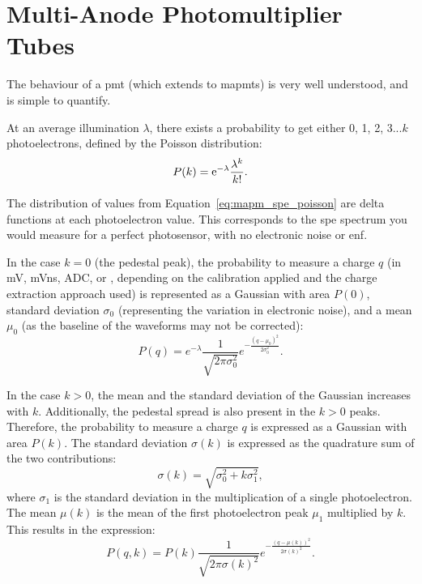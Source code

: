 \section{Multi-Anode Photomultiplier Tubes}

The behaviour of a \gls{pmt} (which extends to \glspl{mapmt}) is very well understood, and is simple to quantify. 

At an average illumination $\lambda$, there exists a probability to get either 0, 1, 2, 3...$k$ photoelectrons, defined by the Poisson distribution:
\begin{equation} \label{eq:mapm_spe_poisson}
P(k) = \mathrm{e}^{-\lambda} \frac{\lambda^k}{k!}.
\end{equation}

The distribution of values from Equation~\ref{eq:mapm_spe_poisson} are delta functions at each photoelectron value. This corresponds to the \gls{spe} spectrum you would measure for a perfect photosensor, with no electronic noise or \gls{enf}. 

In the case $k = 0$ (the pedestal peak), the probability to measure a charge $q$ (in \si{mV}, \si{mVns}, \si{ADC}, or \si{\pe}, depending on the calibration applied and the charge extraction approach used) is represented as a Gaussian with area $P(0)$, standard deviation $\sigma_0$ (representing the variation in electronic noise), and a mean $\mu_0$ (as the baseline of the waveforms may not be corrected):
\begin{equation} \label{eq:mapm_spe_ped}
P(q) = e^{-\lambda} \frac{1}{\sqrt{2 \pi \sigma_0^2}} e^{-\frac{(q - \mu_0)^2}{2 \sigma_0^2}}.
\end{equation}

In the case $k > 0$, the mean and the standard deviation of the Gaussian increases with $k$. Additionally, the pedestal spread is also present in the $k > 0$ peaks. Therefore, the probability to measure a charge $q$ is expressed as a Gaussian with area $P(k)$. The standard deviation $\sigma(k)$ is expressed as the quadrature sum of the two contributions:
\begin{equation}
\sigma(k) = \sqrt{\sigma_0^2 + k \sigma_1^2},
\end{equation}
where $\sigma_1$ is the standard deviation in the multiplication of a single photoelectron.
The mean $\mu(k)$ is the mean of the first photoelectron peak $\mu_1$ multiplied by $k$. This results in the expression:
\begin{equation}
P(q, k) = P(k) \frac{1}{\sqrt{2 \pi \sigma(k)^2}} e^{-\frac{(q - \mu(k))^2}{2 \sigma(k)^2}}.
\end{equation}

